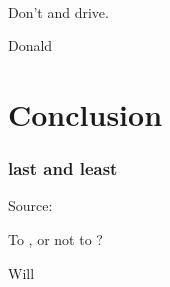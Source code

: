 \documentclass[aspectratio=169]{beamer}
\title{\deliv{\pp}{Presentation}}
\date{\datepp}
\begin{document}

\begin{frame}
\maketitle
\begin{center}
\names \\
\epigraph{Don't \tex{} and drive.}{Donald}
\end{center}
\end{frame}

\begin{frame}
\tableofcontents
\end{frame}







\section{Conclusion}
\frame{\sectionpage}

\begin{frame}
\frametitle{last and least}
Source: \github
\epigraph{To \cry, or not to \cry?}{Will}
\end{frame}

\end{document}
